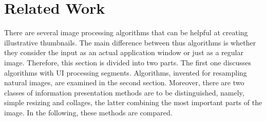 \documentclass[draft,final]{vutinfth} %
\begin{document}
	\chapter{Related Work}
	There are several image processing algorithms that can be helpful at creating illustrative thumbnails.
	The main difference between thus algorithms is whether they consider the input as an actual application window or just as a regular image.
	Therefore, this section is divided into two parts.
	The first one discusses algorithms with UI processing segments.
	Algorithms, invented for resampling natural images, are examined in the second section. 
	Moreover, there are two classes of information presentation methods are to be distinguished, namely, simple resizing and collages, the latter combining the most important parts of the image. 
	In the following, these methods are compared.
	
\end{document}

